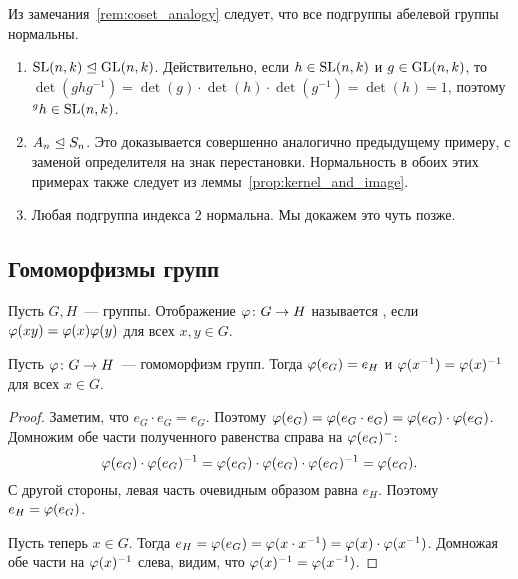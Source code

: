 \begin{remark}
Из замечания~\ref{rem:coset_analogy} следует, что все подгруппы
абелевой группы нормальны.
\end{remark}

\begin{examples}\label{examples:normal_subgroups}
\hspace{1em}
\begin{enumerate}
\item $\operatorname{SL}(n,k)\trianglelefteq\operatorname{GL}(n,k)$. Действительно, если $h\in\operatorname{SL}(n,k)$ и
  $g\in\operatorname{GL}(n,k)$, то $\det(ghg^{-1}) =
  \det(g)\cdot\det(h)\cdot\det(g^{-1}) = \det(h) = 1$, поэтому
  ${}^gh\in\operatorname{SL}(n,k)$.
\item $A_n\trianglelefteq S_n$. Это доказывается совершенно аналогично
  предыдущему примеру, с заменой определителя на знак
  перестановки. Нормальность в обоих этих примерах также следует из
  леммы~\ref{prop:kernel_and_image}.
\item\label{item:normal_subgroup_of_index_2} Любая подгруппа индекса
  $2$ нормальна. Мы докажем это чуть позже.
\end{enumerate}
\end{examples}

\subsection{Гомоморфизмы групп}


\begin{definition}
Пусть $G,H$~--- группы.
Отображение $\varphi\colon G\to H$ называется ,
если $\varphi(xy) = \varphi(x)\varphi(y)$ для всех $x,y\in G$.
\end{definition}
\begin{lemma}
Пусть $\varphi\colon G\to H$~--- гомоморфизм групп. Тогда $\varphi(e_G) = e_H$
и $\varphi(x^{-1}) = \varphi(x)^{-1}$ для всех $x\in G$.
\end{lemma}
\begin{proof}
Заметим, что $e_G\cdot e_G = e_G$. Поэтому $\varphi(e_G) = \varphi(e_G\cdot
e_G) = \varphi(e_G)\cdot \varphi(e_G)$. Домножим обе части полученного
равенства справа на $\varphi(e_G)^{-}$:
$$
\varphi(e_G)\cdot \varphi(e_G)^{-1} = \varphi(e_G)\cdot \varphi(e_G)\cdot
\varphi(e_G)^{-1} = \varphi(e_G).
$$
С другой стороны, левая часть очевидным образом равна $e_H$.
Поэтому $e_H = \varphi(e_G)$.

Пусть теперь $x\in G$. Тогда $e_H = \varphi(e_G) = \varphi(x\cdot x^{-1}) =
\varphi(x)\cdot \varphi(x^{-1})$. 
Домножая обе части на $\varphi(x)^{-1}$ слева, видим, что
$\varphi(x)^{-1} = \varphi(x^{-1})$.
\end{proof}


